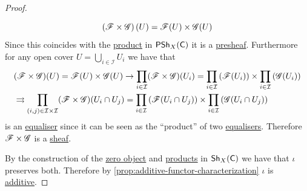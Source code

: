 \documentclass[../../main]{subfiles}
\begin{document}
\begin{proof}
\begin{enumerate}
          \begin{equation*}
            \left( \mathscr{F} \times \mathscr{G} \right)(U) = \mathscr{F}(U) \times \mathscr{G}(U)
          \end{equation*}
          Since this coincides with the \hyperref[def:categorical-product]{product} in \(\mathsf{PSh}_{X}(\mathsf{C})\) it is a \hyperref[def:presheaf]{presheaf}.
          Furthermore for any open cover \(U = \bigcup_{i \in \mathcal{I}} U_{i}\) we have that
          \begin{align*}
            &(\mathscr{F} \times \mathscr{G})(U) = \mathscr{F}(U) \times \mathscr{G}(U) \to \prod_{i \in \mathcal{I}} (\mathscr{F} \times \mathscr{G})(U_{i}) = \prod_{i \in \mathcal{I}} \left(\mathscr{F}(U_{i})\right) \times \prod_{i \in \mathcal{I}} \left(\mathscr{G}(U_{i})\right) \\
            &\rightrightarrows \displaystyle\prod_{(i, j) \in \mathcal{I} \times \mathcal{I}} (\mathscr{F} \times \mathscr{G})(U_{i} \cap U_{j}) = \prod_{i \in \mathcal{I}} \left(\mathscr{F}(U_{i} \cap U_{j})\right) \times  \prod_{i \in \mathcal{I}} \left(\mathscr{G}(U_{i} \cap U_{j})\right)
          \end{align*}
          is an \hyperref[def:equaliser]{equaliser} since it can be seen as the ``product'' of two \hyperref[def:equaliser]{equalisers}.
          Therefore \(\mathscr{F} \times \mathscr{G}\) is a \hyperref[def:sheaf]{sheaf}.
  \end{enumerate}

  By the construction of the \hyperref[def:zero-object]{zero object} and \hyperref[def:categorical-product]{products} in \(\mathsf{Sh}_{X}(\mathsf{C})\) we have that \(\iota\) preserves both.
  Therefore by \autoref{prop:additive-functor-characterization} \(\iota\) is \hyperref[def:additive-functor]{additive}.
\end{proof}
\end{document}
